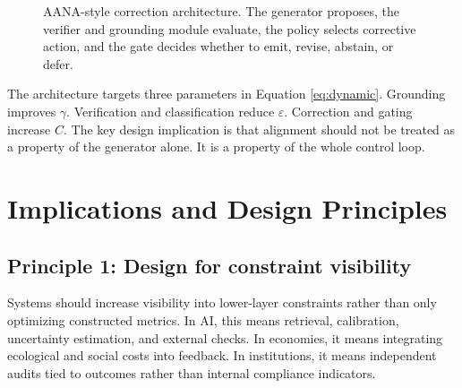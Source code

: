 \documentclass[11pt]{article}
\newcommand{\eps}{\varepsilon}
\begin{document}
\begin{figure}[t]
\centering
{}
\caption{AANA-style correction architecture. The generator proposes, the verifier and grounding module evaluate, the policy selects corrective action, and the gate decides whether to emit, revise, abstain, or defer.}
\label{fig:aana}
\end{figure}

The architecture targets three parameters in Equation \eqref{eq:dynamic}. Grounding improves \(\gamma\). Verification and classification reduce \(\eps\). Correction and gating increase \(C\). The key design implication is that alignment should not be treated as a property of the generator alone. It is a property of the whole control loop.

\section{Implications and Design Principles}

\subsection{Principle 1: Design for constraint visibility}

Systems should increase visibility into lower-layer constraints rather than only optimizing constructed metrics. In AI, this means retrieval, calibration, uncertainty estimation, and external checks. In economies, it means integrating ecological and social costs into feedback. In institutions, it means independent audits tied to outcomes rather than internal compliance indicators.
\end{document}
